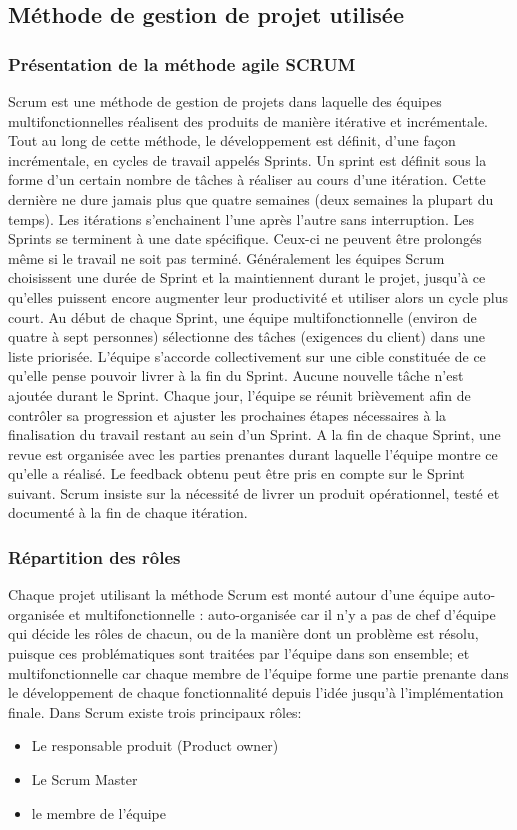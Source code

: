 \subsection{Méthode de gestion de projet utilisée}
\subsubsection{Présentation de la méthode agile SCRUM}

Scrum est une méthode de gestion de projets dans laquelle des équipes
multifonctionnelles réalisent des produits de manière itérative et incrémentale. Tout au
long de cette méthode, le développement est définit, d’une façon incrémentale, en cycles
de travail appelés Sprints. Un sprint est définit sous la forme d’un certain nombre de
tâches à réaliser au cours d’une itération. Cette dernière ne dure jamais plus que quatre
semaines (deux semaines la plupart du temps). Les itérations s’enchainent l’une après
l’autre sans interruption. Les Sprints se terminent à une date spécifique. Ceux-ci ne
peuvent être prolongés même si le travail ne soit pas terminé. Généralement les équipes
Scrum choisissent une durée de Sprint et la maintiennent durant le projet, jusqu’à ce
qu’elles puissent encore augmenter leur productivité et utiliser alors un cycle plus court.
Au début de chaque Sprint, une équipe multifonctionnelle (environ de quatre à sept
personnes) sélectionne des tâches (exigences du client) dans une liste priorisée.
L’équipe s’accorde collectivement sur une cible constituée de ce qu’elle pense pouvoir
livrer à la fin du Sprint. Aucune nouvelle tâche n’est ajoutée durant le Sprint. Chaque
jour, l’équipe se réunit brièvement afin de contrôler sa progression et ajuster les
prochaines étapes nécessaires à la finalisation du travail restant au sein d’un Sprint. A la
fin de chaque Sprint, une revue est organisée avec les parties prenantes durant laquelle
l’équipe montre ce qu’elle a réalisé. Le feedback obtenu peut être pris en compte sur le
Sprint suivant. Scrum insiste sur la nécessité de livrer un produit opérationnel,
testé et documenté à la fin de chaque itération.



\subsubsection{Répartition des rôles}
Chaque projet utilisant la méthode Scrum est monté autour d’une équipe auto-
organisée et multifonctionnelle : auto-organisée car il n’y a pas de chef d’équipe qui
décide les rôles de chacun, ou de la manière dont un problème est résolu, puisque ces
problématiques sont traitées par l’équipe dans son ensemble; et multifonctionnelle car
chaque membre de l’équipe forme une partie prenante dans le développement de
chaque fonctionnalité depuis l’idée jusqu’à l’implémentation finale.
Dans Scrum existe trois principaux rôles:
\begin{itemize}
 \item Le responsable produit (Product owner)
 \item Le Scrum Master
 \item le membre de l’équipe
\end{itemize}
